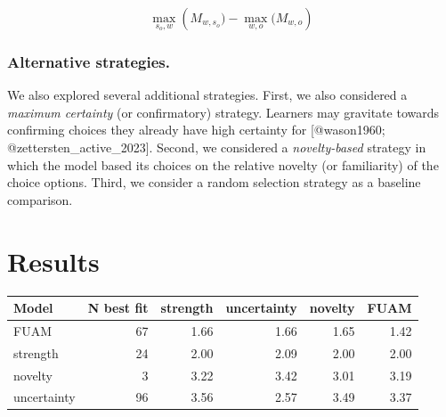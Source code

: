 \documentclass[10pt, letterpaper]{article}
\begin{document}
\begin{equation}
\max_{s_o,w}({M_{w,s_o})- \max_{w,o}(M_{w,o}})
\label{eq:probability_gain}
\end{equation}

\subsubsection{Alternative strategies.}\label{alternative-strategies.}

We also explored several additional strategies. First, we also
considered a \emph{maximum certainty} (or confirmatory) strategy.
Learners may gravitate towards confirming choices they already have high
certainty for {[}@wason1960; @zettersten\_active\_2023{]}. Second, we
considered a \emph{novelty-based} strategy in which the model based its
choices on the relative novelty (or familiarity) of the choice options.
Third, we consider a random selection strategy as a baseline comparison.

\section{Results}\label{results}

\begin{table}[H]
\centering
\begin{tabular}{lrrrrr}
  \hline
Model & N best fit & strength & uncertainty & novelty & FUAM \\ 
  \hline
FUAM &  67 & 1.66 & 1.66 & 1.65 & 1.42 \\ 
  strength &  24 & 2.00 & 2.09 & 2.00 & 2.00 \\ 
  novelty &   3 & 3.22 & 3.42 & 3.01 & 3.19 \\ 
  uncertainty &  96 & 3.56 & 2.57 & 3.49 & 3.37 \\ 
   \hline
\end{tabular}
\end{table}
\end{document}
